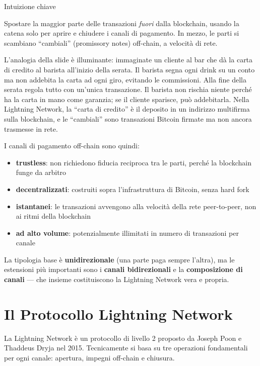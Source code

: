 \documentclass[
  italian,
  openany]{book}
\providecommand{\tightlist}{%
  \setlength{\itemsep}{0pt}\setlength{\parskip}{0pt}}
\begin{document}
\begin{callouttip}{Intuizione chiave}

Spostare la maggior parte delle transazioni \emph{fuori} dalla
blockchain, usando la catena solo per aprire e chiudere i canali di
pagamento. In mezzo, le parti si scambiano ``cambiali'' (promissory
notes) off-chain, a velocità di rete.

\end{callouttip}

L'analogia della slide è illuminante: immaginate un cliente al bar che
dà la carta di credito al barista all'inizio della serata. Il barista
segna ogni drink su un conto ma non addebita la carta ad ogni giro,
evitando le commissioni. Alla fine della serata regola tutto con
un'unica transazione. Il barista non rischia niente perché ha la carta
in mano come garanzia; se il cliente sparisce, può addebitarla. Nella
Lightning Network, la ``carta di credito'' è il deposito in un indirizzo
multifirma sulla blockchain, e le ``cambiali'' sono transazioni Bitcoin
firmate ma non ancora trasmesse in rete.

I canali di pagamento off-chain sono quindi:

\begin{itemize}
\tightlist
\item
  \textbf{trustless}: non richiedono fiducia reciproca tra le parti,
  perché la blockchain funge da arbitro
\item
  \textbf{decentralizzati}: costruiti sopra l'infrastruttura di Bitcoin,
  senza hard fork
\item
  \textbf{istantanei}: le transazioni avvengono alla velocità della rete
  peer-to-peer, non ai ritmi della blockchain
\item
  \textbf{ad alto volume}: potenzialmente illimitati in numero di
  transazioni per canale
\end{itemize}

La tipologia base è \textbf{unidirezionale} (una parte paga sempre
l'altra), ma le estensioni più importanti sono i \textbf{canali
bidirezionali} e la \textbf{composizione di canali} --- che insieme
costituiscono la Lightning Network vera e propria.

\section{Il Protocollo Lightning
Network}\label{il-protocollo-lightning-network}

La Lightning Network è un protocollo di livello 2 proposto da Joseph
Poon e Thaddeus Dryja nel 2015. Tecnicamente si basa su tre operazioni
fondamentali per ogni canale: apertura, impegni off-chain e chiusura.
\end{document}
